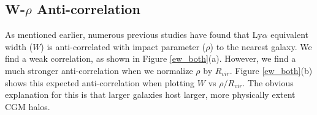 \documentclass[iop]{emulateapj-rtx4}
\begin{document}
\subsection{W-$\rho$ Anti-correlation}
As mentioned earlier, numerous previous studies have found that Ly$\alpha$ equivalent width ($W$) is anti-correlated with impact parameter ($\rho$) to the nearest galaxy. We find a weak correlation, as shown in Figure \ref{ew_both}(a). However, we find a much stronger anti-correlation when we normalize $\rho$ by $R_{vir}$. Figure \ref{ew_both}(b) shows this expected anti-correlation when plotting $W$ vs $\rho/R_{vir}$. The obvious explanation for this is that larger galaxies host larger, more physically extent CGM halos. 






%
\end{document}

